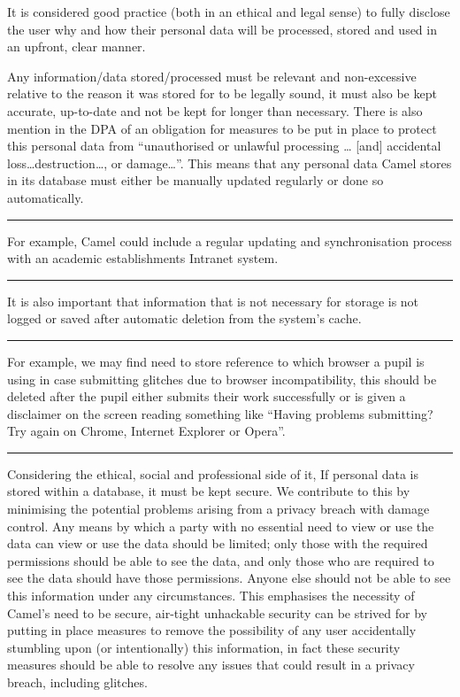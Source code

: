     It is considered good practice (both in an ethical and legal sense) to fully disclose the user why and how their personal data will be processed, stored and used in an upfront, clear manner. 

    Any information/data stored/processed must be relevant and non-excessive relative to the reason it was stored for to be legally sound, it must also be kept accurate, up-to-date and not be kept for longer than necessary. There is also mention in the DPA of an obligation for measures to be put in place to protect this personal data from “unauthorised or unlawful processing … [and] accidental loss\ldots destruction\ldots, or damage\ldots”.\cite{DPA:tDPP:S1} This means that any personal data Camel stores in its database must either be manually updated regularly or done so automatically.

	\vspace{0.35cm}
    \hrule
    {\raggedleft \scriptsize For example, Camel could include a regular updating and synchronisation process with an academic establishments Intranet system. \par}
    \vspace{0.35cm}
    \hrule

    It is also important that information that is not necessary for storage is not logged or saved after automatic deletion from the system’s cache.

	\vspace{0.35cm}
    \hrule
    {\raggedleft \scriptsize  For example, we may find need to store reference to which browser a pupil is using in case submitting glitches due to  browser incompatibility, this should be deleted after the pupil either submits their work successfully or is given a disclaimer on the screen reading something like “Having problems submitting? Try again on Chrome, Internet Explorer or Opera”.\par}
    \vspace{0.35cm}
    \hrule

    Considering the ethical, social and professional side of it, If personal data is stored within a database, it must be kept secure. We contribute to this by minimising the potential problems arising from a privacy breach with damage control. Any means by which a party with no essential need to view or use the data can view or use the data should be limited; only those with the required permissions should be able to see the data, and only those who are required to see the data should have those permissions. Anyone else should not be able to see this information under any circumstances. This emphasises the necessity of Camel’s need to be secure, air-tight unhackable security can be strived for by putting in place measures to remove the possibility of any user accidentally stumbling upon (or intentionally) this information, in fact these security measures should be able to resolve any issues that could result in a privacy breach, including glitches.

